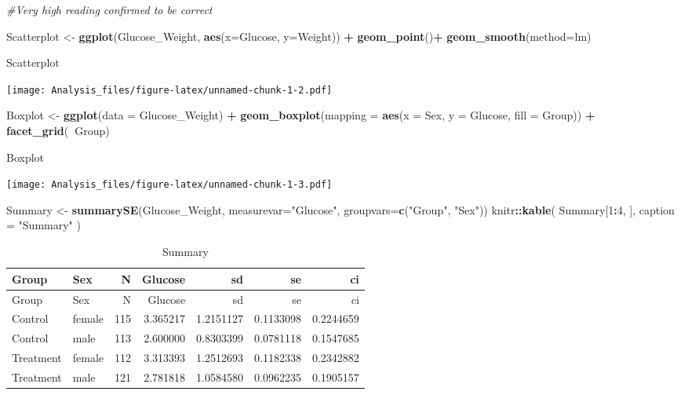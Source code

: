 \documentclass[]{article}
\newenvironment{Shaded}{\begin{snugshade}}{\end{snugshade}}
\newcommand{\KeywordTok}[1]{\textcolor[rgb]{0.13,0.29,0.53}{\textbf{#1}}}
\newcommand{\DataTypeTok}[1]{\textcolor[rgb]{0.13,0.29,0.53}{#1}}
\newcommand{\DecValTok}[1]{\textcolor[rgb]{0.00,0.00,0.81}{#1}}
\newcommand{\StringTok}[1]{\textcolor[rgb]{0.31,0.60,0.02}{#1}}
\newcommand{\CommentTok}[1]{\textcolor[rgb]{0.56,0.35,0.01}{\textit{#1}}}
\newcommand{\OperatorTok}[1]{\textcolor[rgb]{0.81,0.36,0.00}{\textbf{#1}}}
\newcommand{\NormalTok}[1]{#1}
\begin{document}
\begin{Shaded}
\begin{Highlighting}[]
\CommentTok{#Very high reading confirmed to be correct}

\NormalTok{Scatterplot <-}\StringTok{ }\KeywordTok{ggplot}\NormalTok{(Glucose_Weight, }\KeywordTok{aes}\NormalTok{(}\DataTypeTok{x=}\NormalTok{Glucose, }\DataTypeTok{y=}\NormalTok{Weight)) }\OperatorTok{+}\StringTok{ }
\StringTok{  }\KeywordTok{geom_point}\NormalTok{()}\OperatorTok{+}
\StringTok{  }\KeywordTok{geom_smooth}\NormalTok{(}\DataTypeTok{method=}\NormalTok{lm)}

\NormalTok{Scatterplot}
\end{Highlighting}
\end{Shaded}

\texttt{[image: Analysis\_files/figure-latex/unnamed-chunk-1-2.pdf]}

\begin{Shaded}
\begin{Highlighting}[]
\NormalTok{Boxplot <-}\StringTok{ }\KeywordTok{ggplot}\NormalTok{(}\DataTypeTok{data =}\NormalTok{ Glucose_Weight) }\OperatorTok{+}
\StringTok{  }\KeywordTok{geom_boxplot}\NormalTok{(}\DataTypeTok{mapping =} \KeywordTok{aes}\NormalTok{(}\DataTypeTok{x =}\NormalTok{ Sex, }\DataTypeTok{y =}\NormalTok{ Glucose, }\DataTypeTok{fill =}\NormalTok{ Group)) }\OperatorTok{+}
\StringTok{  }\KeywordTok{facet_grid}\NormalTok{(}\OperatorTok{~}\NormalTok{Group)}

\NormalTok{Boxplot}
\end{Highlighting}
\end{Shaded}

\texttt{[image: Analysis\_files/figure-latex/unnamed-chunk-1-3.pdf]}

\begin{Shaded}
\begin{Highlighting}[]
\NormalTok{Summary <-}\StringTok{ }\KeywordTok{summarySE}\NormalTok{(Glucose_Weight, }\DataTypeTok{measurevar=}\StringTok{"Glucose"}\NormalTok{, }\DataTypeTok{groupvars=}\KeywordTok{c}\NormalTok{(}\StringTok{"Group"}\NormalTok{, }\StringTok{"Sex"}\NormalTok{))}
\NormalTok{knitr}\OperatorTok{::}\KeywordTok{kable}\NormalTok{(}
\NormalTok{  Summary[}\DecValTok{1}\OperatorTok{:}\DecValTok{4}\NormalTok{, ], }
  \DataTypeTok{caption =} \StringTok{"Summary"}
\NormalTok{)}
\end{Highlighting}
\end{Shaded}

\begin{longtable}[]{@{}llrrrrr@{}}
\caption{Summary}\tabularnewline
\toprule
Group & Sex & N & Glucose & sd & se & ci\tabularnewline
\midrule
\endfirsthead
\toprule
Group & Sex & N & Glucose & sd & se & ci\tabularnewline
\midrule
\endhead
Control & female & 115 & 3.365217 & 1.2151127 & 0.1133098 &
0.2244659\tabularnewline
Control & male & 113 & 2.600000 & 0.8303399 & 0.0781118 &
0.1547685\tabularnewline
Treatment & female & 112 & 3.313393 & 1.2512693 & 0.1182338 &
0.2342882\tabularnewline
Treatment & male & 121 & 2.781818 & 1.0584580 & 0.0962235 &
0.1905157\tabularnewline
\bottomrule
\end{longtable}
\end{document}
